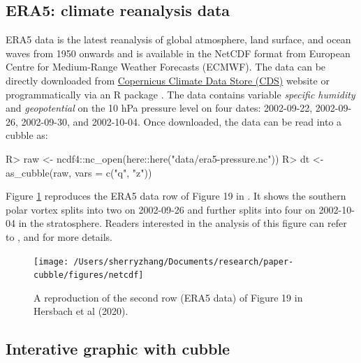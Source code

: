 \documentclass[
]{jss}
\begin{document}
\hypertarget{era5-climate-reanalysis-data}{%
\subsection{ERA5: climate reanalysis
data}\label{era5-climate-reanalysis-data}}

ERA5 data \citep{hersbach2020era5} is the latest reanalysis of global
atmosphere, land surface, and ocean waves from 1950 onwards and is
available in the NetCDF format from European Centre for Medium-Range
Weather Forecasts (ECMWF). The data can be directly downloaded from
\href{https://cds.climate.copernicus.eu/cdsapp\#!/dataset/reanalysis-era5-pressure-levels?tab=overview}{Copernicus
Climate Data Store (CDS)} website or programmatically via an R package
 \citep{ecwmfr}. The  data contains
variable \emph{specific humidity} and \emph{geopotential} on the 10 hPa
pressure level on four dates: 2002-09-22, 2002-09-26, 2002-09-30, and
2002-10-04. Once downloaded, the data can be read into a cubble as:

\begin{CodeChunk}
\begin{CodeInput}
R> raw <- ncdf4::nc_open(here::here("data/era5-pressure.nc"))
R> dt <- as_cubble(raw, vars = c("q", "z"))
\end{CodeInput}
\end{CodeChunk}

Figure \ref{fig:netcdf} reproduces the ERA5 data row of Figure 19 in
\citet{hersbach2020era5}. It shows the southern polar vortex splits into
two on 2002-09-26 and further splits into four on 2002-10-04 in the
stratosphere. Readers interested in the analysis of this figure can
refer to \citet{hersbach2020era5}, \citet{simmons2020global} and
\citet{simmons2005ecmwf} for more details.

\begin{CodeChunk}
\begin{figure}

{\centering \texttt{[image: /Users/sherryzhang/Documents/research/paper-cubble/figures/netcdf]} 

}

\caption[A reproduction of the second row (ERA5 data) of Figure 19 in  Hersbach et al (2020)]{A reproduction of the second row (ERA5 data) of Figure 19 in  Hersbach et al (2020).}\label{fig:netcdf}
\end{figure}
\end{CodeChunk}

\hypertarget{interative-graphic-with-cubble}{%
\subsection{Interative graphic with
cubble}\label{interative-graphic-with-cubble}}
\end{document}
